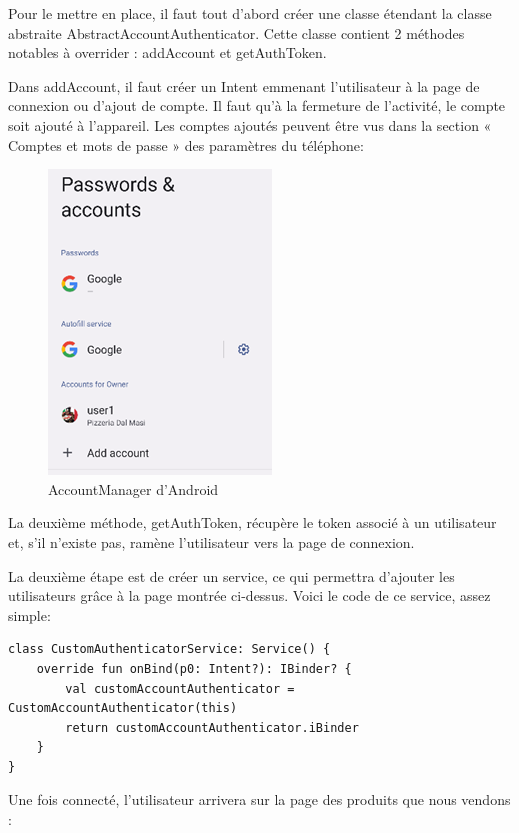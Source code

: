 Pour le mettre en place, il faut tout d'abord créer une classe étendant la classe abstraite
AbstractAccountAuthenticator. Cette classe contient 2 méthodes notables à overrider : addAccount et
getAuthToken.

Dans addAccount, il faut créer un Intent emmenant l'utilisateur à la page de connexion ou d'ajout de
compte. Il faut qu'à la fermeture de l'activité, le compte soit ajouté à l'appareil. Les comptes ajoutés
peuvent être vus dans la section « Comptes et mots de passe » des paramètres du téléphone:

\begin{figure}[H]
    \centering
    \includegraphics[scale=.9]{./img/joey-img-5.png}
    \caption{AccountManager d'Android}
    \label{fig:poc-account-manager}
\end{figure}

La deuxième méthode, getAuthToken, récupère le token associé à un utilisateur et, s'il n'existe pas,
ramène l'utilisateur vers la page de connexion.

La deuxième étape est de créer un service, ce qui permettra d'ajouter les utilisateurs grâce à la page
montrée ci-dessus. Voici le code de ce service, assez simple:

\begin{listing}[H]
    \begin{verbatim}
class CustomAuthenticatorService: Service() {
    override fun onBind(p0: Intent?): IBinder? {
        val customAccountAuthenticator = CustomAccountAuthenticator(this)
        return customAccountAuthenticator.iBinder
    }
}
    \end{verbatim}
    \caption{}
    \label{listing:bind-thing}
\end{listing}

Une fois connecté, l'utilisateur arrivera sur la page des produits que nous vendons :

